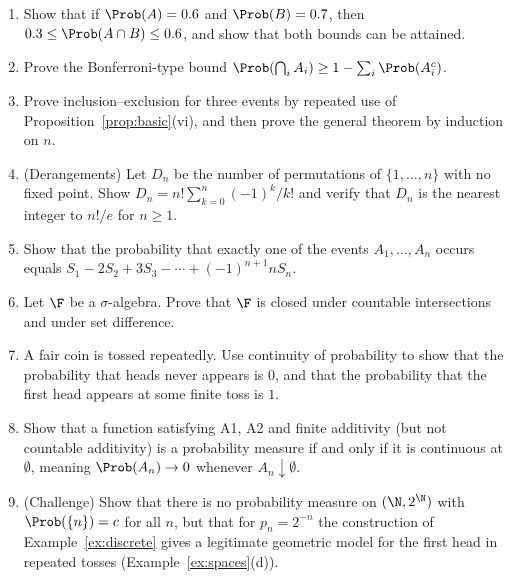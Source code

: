 \begin{enumerate}
\item Show that if $\Prob(A)=0.6$ and $\Prob(B)=0.7$, then
$0.3\le\Prob(A\cap B)\le0.6$, and show that both bounds can be attained.
\item Prove the Bonferroni-type bound
$\Prob(\bigcap_iA_i)\ge1-\sum_i\Prob(A_i^c)$.
\item Prove inclusion--exclusion for three events by repeated use of
Proposition~\ref{prop:basic}(vi), and then prove the general theorem by induction
on $n$.
\item (Derangements) Let $D_n$ be the number of permutations of $\{1,\dots,n\}$
with no fixed point. Show $D_n=n!\sum_{k=0}^n(-1)^k/k!$ and verify that
$D_n$ is the nearest integer to $n!/e$ for $n\ge 1$.
\item Show that the probability that exactly one of the events $A_1,\dots,A_n$
occurs equals $S_1-2S_2+3S_3-\cdots+(-1)^{n+1}nS_n$.
\item Let $\F$ be a $\sigma$-algebra. Prove that $\F$ is closed under countable
intersections and under set difference.
\item A fair coin is tossed repeatedly. Use continuity of probability to show
that the probability that heads never appears is $0$, and that the probability
that the first head appears at some finite toss is $1$.
\item Show that a function satisfying A1, A2 and finite additivity (but not
countable additivity) is a probability measure if and only if it is continuous
at $\emptyset$, meaning $\Prob(A_n)\to0$ whenever $A_n\downarrow\emptyset$.
\item (Challenge) Show that there is no probability measure on $(\N,2^\N)$ with
$\Prob(\{n\})=c$ for all $n$, but that for $p_n=2^{-n}$ the construction of
Example~\ref{ex:discrete} gives a legitimate geometric model for the first
head in repeated tosses (Example~\ref{ex:spaces}(d)).
\end{enumerate}
